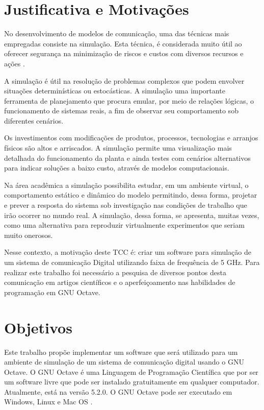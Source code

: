 \section{Justificativa e Motivações}

No desenvolvimento de modelos de comunicação, uma das técnicas mais empregadas consiste na simulação. Esta técnica, é considerada muito útil ao oferecer segurança na minimização de riscos e custos com diversos recursos e ações \cite{shannon1998introduction}.

A simulação é útil na resolução de problemas complexos que podem envolver situações determinísticas ou estocásticas. A simulação uma importante ferramenta de planejamento que procura emular, por meio de relações lógicas, o funcionamento de sistemas reais, a fim de observar seu comportamento sob diferentes cenários.

Os investimentos com modificações de produtos, processos, tecnologias e arranjos físicos são altos e arriscados. A simulação permite uma visualização mais detalhada do funcionamento da planta e ainda testes com cenários alternativos para indicar soluções a baixo custo, através de modelos computacionais.

Na área acadêmica a simulação possibilita estudar, em um ambiente virtual, o comportamento estático e dinâmico do modelo permitindo, dessa forma, projetar e prever a resposta do sistema sob investigação nas condições de trabalho que irão ocorrer no mundo real. A simulação, dessa forma, se apresenta, muitas vezes, como uma alternativa para reproduzir virtualmente experimentos que seriam muito onerosos.

Nesse contexto, a motivação deste TCC é: criar um software para simulação de um sistema de comunicação Digital utilizando faixa de frequência de 5 GHz. Para realizar este trabalho foi necessário a pesquisa de diversos pontos desta comunicação em artigos científicos e o aperfeiçoamento nas habilidades de programação em GNU Octave. 

\section{Objetivos}

Este trabalho propõe implementar um software que será utilizado para um ambiente de simulação de um sistema de comunicação digital usando o GNU Octave. O GNU Octave é uma Linguagem de Programação Científica que por ser um software livre que pode ser instalado gratuitamente em qualquer computador. Atualmente, está na versão 5.2.0. O GNU Octave pode ser executado em Windows, Linux e Mac OS \nocite{octave}. 

